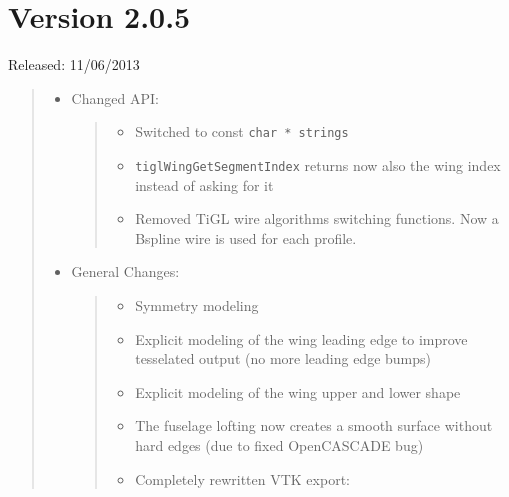 \documentclass[]{scrartcl}
\begin{document}
\section{Version 2.0.5}

Released: 11/06/2013

\begin{quote}
\begin{itemize}
\item
  Changed API:

  \begin{quote}
  \begin{itemize}
  \itemsep1pt\parskip0pt
  \item
    Switched to const \texttt{char * strings}
  \item
    \texttt{tiglWingGetSegmentIndex} returns now also the wing index
    instead of asking for it
  \item
    Removed TiGL wire algorithms switching functions. Now a Bspline wire
    is used for each profile.
  \end{itemize}
  \end{quote}
\item
  General Changes:

  \begin{quote}
  \begin{itemize}
  \item
    Symmetry modeling
  \item
    Explicit modeling of the wing leading edge to improve tesselated
    output (no more leading edge bumps)
  \item
    Explicit modeling of the wing upper and lower shape
  \item
    The fuselage lofting now creates a smooth surface without hard edges
    (due to fixed OpenCASCADE bug)
  \item
    Completely rewritten VTK export:


\end{itemize}
\end{quote}
\end{itemize}
\end{quote}
\end{document}
